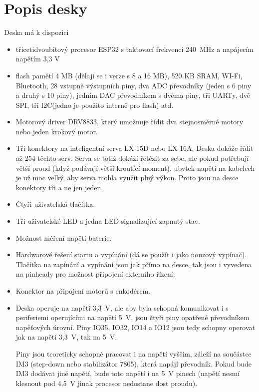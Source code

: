 \documentclass{template/socthesis}
\begin{document}
\section{Popis desky}

Deska má k dispozici

\begin{itemize}
	\item třicetidvoubitový procesor ESP32 s taktovací frekvencí 240~MHz a napájecím napětím 3,3 V 
	\item flash pamětí 4 MB (dělají se i verze s 8 a 16 MB), 520 KB SRAM, WI-Fi, Bluetooth, 28 vstupně výstupních piny, dva ADC převodníky (jeden s 6 piny a druhý s 10 piny), jedním DAC převodníkem s dvěma piny, tři UARTy, dvě SPI, tři I2C(jedno je použito interně pro flash) atd.
	
	\item Motorový driver DRV8833, který umožnuje řídit dva stejnosměrné motory nebo jeden krokový motor.
	
	\item Tři konektory na inteligentní serva LX-15D nebo LX-16A. Deska dokáže řídit až 254 těchto serv. Serva se totiž dokáží řetězit za sebe, ale pokud potřebují větší proud (když podávají větší kroutící moment), ubytek napětí na kabelech je už moc velký, aby serva mohla využít plný výkon. Proto jsou na desce konektory tři a ne jen jeden.
	
	\item Čtyři uživatelská tlačítka.
	
	\item Tři uživatelské LED a jedna LED signalizující zapnutý stav.
	
	\item Možnost měření napětí baterie.
	
	\item Hardwarové řešení startu a vypínání (dá se použít i jako nouzový vypínač). Tlačítka na zapínání a vypínání jsou jak přímo na desce, tak jsou i vyvedena na pinheady pro možnost připojení externího řízení.
	
	\item Konektor na připojení motorů s enkodérem.
	
	\item Deska operuje na napětí 3,3~V, ale aby byla schopná komunikovat i s periferiemi operujícími
	na napětí 5~V, jsou čtyři piny opatřené převodníkem napěťových úrovní.
	Piny IO35, IO32, IO14 a IO12 jsou tedy schopny operovat jak na napětí 3,3~V, tak na 5~V.
	
	Piny jsou teoreticky schopné pracovat i na napětí vyšším, záleží na součástce IM3
	(step-down nebo stabilizátor 7805), která napájí převodník. Pokud bude IM3 dodávat jiné napětí, bude toto napětí i na 5~V pinech (napětí nesmí klesnout pod 4,5~V jinak procesor nedostane dost proudu).
	

\end{itemize}
\end{document}
